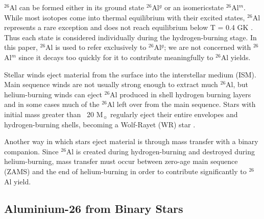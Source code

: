 $^{26}$Al can be formed either in its ground state $^{26}$Al$^g$ or an isomeric\footnotemark state $^{26}$Al$^m$.
While most isotopes come into thermal equilibrium with their excited states, $^{26}$Al represents a rare exception and does not reach equilibrium below T = 0.4 GK \citep{Iliadis2015}. Thus each state is considered individually during the hydrogen-burning stage. 
In this paper, $^{26}$Al is used to refer exclusively to $^{26}$Al$^g$; we are not concerned with $^{26}$Al$^m$ since it decays too quickly for it to contribute meaningfully to $^{26}$Al yields.

Stellar winds eject material from the surface into the interstellar medium (ISM).
Main sequence winds are not usually strong enough to extract much $^{26}$Al, but helium-burning winds can eject $^{26}$Al produced in shell hydrogen burning layers and in some cases much of the $^{26}$Al left over from the main sequence.
Stars with initial mass greater than ~20 M$_{\sun}$ regularly eject their entire envelopes and hydrogen-burning shells, becoming a Wolf-Rayet (WR) star \citep{Carroll2007}.

Another way in which stars eject material is through mass transfer with a binary companion.
Since $^{26}$Al is created during hydrogen-burning and destroyed during helium-burning, mass transfer must occur between zero-age main sequence (ZAMS) and the end of helium-burning in order to contribute significantly to $^{26}$Al yield.

\subsection{Aluminium-26 from Binary Stars}

